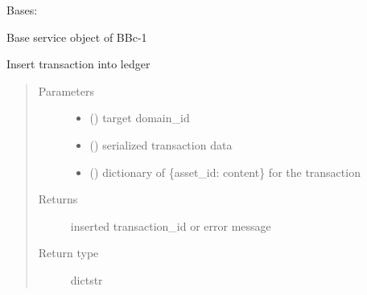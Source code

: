 \documentclass[letterpaper,10pt,english]{sphinxmanual}
\begin{document}
\begin{fulllineitems}
\label{\detokenize{bbc1.core.bbc_core:bbc1.core.bbc_core.BBcCoreService}}
Bases: 

Base service object of BBc-1

\begin{fulllineitems}
\label{\detokenize{bbc1.core.bbc_core:bbc1.core.bbc_core.BBcCoreService.insert_transaction}}
Insert transaction into ledger
\begin{quote}\begin{description}
\item[{Parameters}] \leavevmode\begin{itemize}
\item {} 
 () \textendash{} target domain\_id

\item {} 
 () \textendash{} serialized transaction data

\item {} 
 () \textendash{} dictionary of \{asset\_id: content\} for the transaction

\end{itemize}

\item[{Returns}] \leavevmode
inserted transaction\_id or error message

\item[{Return type}] \leavevmode
dict\textbar{}str

\end{description}\end{quote}


\end{fulllineitems}
\end{fulllineitems}
\end{document}
